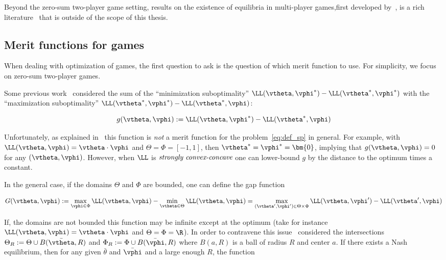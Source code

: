 Beyond the zero-sum two-player game setting, results on the existence of equilibria in multi-player games,first developed by~\citet{nash1950equilibrium}, is a rich literature~\citep{nash1951non,glicksberg1952further,nikaido1955note,dasgupta1986existence} that is outside of the scope of this thesis. 







\subsection{Merit functions for games}

\label{sub:merit_function_games}

When dealing with optimization of games, the first question to ask is the question of which merit function to use. For simplicity, we focus on zero-sum two-player games.

Some previous work~\citep{yadav2017stabilizing} considered the sum of the ``minimization suboptimality'' $\LL(\vtheta,\vphi^*) - \LL(\vtheta^*,\vphi^*)$ with the ``maximization suboptimality'' $\LL(\vtheta^*,\vphi^*) - \LL(\vtheta^*,\vphi)$:

\begin{equation}
g(\vtheta,\vphi) := \LL(\vtheta,\vphi^*) - \LL(\vtheta^*,\vphi)
\end{equation}

Unfortunately, as explained in~\citep{gidel2017frank} this function is \emph{not} a merit function for the problem~\ref{eq:def_sp} in general. For example, with $\LL(\vtheta,\vphi) = \vtheta \cdot \vphi$ and $\Theta = \Phi = [-1,1]$, then $\vtheta^* = \vphi^* = \bm{0}$, implying that $ g(\vtheta,\vphi) = 0$ for any $(\vtheta,\vphi)$. However, when $\LL$ is $\emph{strongly convex-concave}$ one can lower-bound $g$ by the distance to the optimum times a constant.




In the general case, if the domains $\Theta$ and $\Phi$ are bounded, one can define the gap function

\begin{equation}\label{eq:def_G}
G(\vtheta,\vphi) := \max_{\vphi \in \Phi} \LL(\vtheta,\vphi) - \min_{\vtheta \in \Theta}\LL(\vtheta,\vphi) = \max_{(\vtheta',\vphi') \in \Theta\times\Phi} \LL(\vtheta,\vphi') - \LL(\vtheta',\vphi) 
\end{equation}

If, the domains are not bounded this function may be infinite except at the optimum (take for instance $\LL(\vtheta,\vphi) = \vtheta \cdot \vphi$ and $\Theta = \Phi = \R$). In order to contravene this issue~\citet{nesterov2007dual} considered the intersections $\Theta_R := \Theta \cup B(\bar \vtheta,R)$ and $\Phi_R := \Phi \cup B(\bar \vphi,R)$ where $B(a,R)$ is a ball of radius $R$ and center $a$. If there exists a Nash equilibrium, then for any given $\bar \theta$ and $\bar \vphi$ and a large enough $R$, the function 

